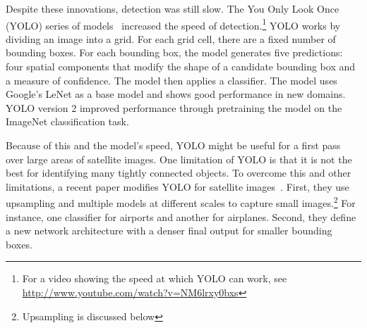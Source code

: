 \documentclass[12pt, a4paper, oneside, headinclude, footinclude]{article}
\begin{document}









Despite these innovations, detection was still slow. The You Only Look Once
(YOLO) series of models~\cite{redmon2016yolo} increased the speed of
detection.\footnote{For a video showing the speed at which YOLO can work, see
\url{http://www.youtube.com/watch?v=NM6lrxy0bxs}} YOLO works by dividing an
image into a grid. For each grid cell, there are a fixed number of bounding
boxes. For each bounding box, the model generates five predictions: four
spatial components that modify the shape of a candidate bounding box and a
measure of confidence. The model then applies a classifier. The model uses
Google's LeNet as a base model and shows good performance in new domains. YOLO
version 2 improved performance through pretraining the model on the ImageNet
classification task.

Because of this and the model's speed, YOLO might be useful for a first pass
over large areas of satellite images. One limitation of YOLO is that it is
not the best for identifying many tightly connected objects. To overcome
this and other limitations, a recent paper modifies YOLO for satellite
images~\cite{YOLT}. First, they use upsampling and multiple models at
different scales to capture small images.\footnote{Upsampling is discussed
below} For instance, one classifier for airports and another for airplanes.
Second, they define a new network architecture with a denser final output for
smaller bounding boxes.
\end{document}
